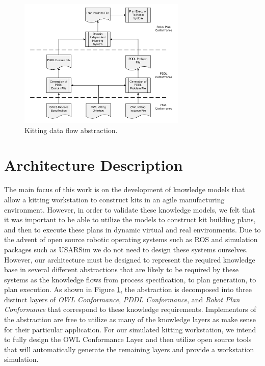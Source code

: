 \documentclass[a4paper, 10pt, conference]{ieeeconf}      %
\begin{document}
\begin{figure}[htb]
\includegraphics[width=8cm]{images/ProcessDataFlowV2.jpg}
\caption{Kitting data flow abstraction.}
\label{fig:ProcessDataFlow}
\end{figure}

\section{Architecture Description}
\label{sect:Architecture}
The main focus of this work is on the development of knowledge models that allow a kitting workstation to construct kits
in an agile manufacturing environment. However, in order to validate these knowledge models, we felt that it was
important to be able to utilize the models to construct kit building plans, and then to execute these plans in dynamic
virtual and real environments. Due to the advent of open source robotic operating systems such as ROS \cite{ROS} and simulation
packages such as USARSim \cite{Balakirsky2007} we do not need to design these systems ourselves. However, our architecture must
be designed to represent the required knowledge base in several different abstractions that are likely to be
required by these systems as the knowledge flows from process specification, to plan generation, to plan execution.
As shown in Figure \ref{fig:ProcessDataFlow}, the abstraction is decomposed into three
distinct layers of {\it OWL Conformance}, {\it PDDL Conformance}, and {\it Robot Plan Conformance} that correspond to these
knowledge requirements. Implementors of the abstraction are free to utilize as many of the knowledge layers as make sense for
their particular application. For our simulated kitting workstation, we intend to fully design the OWL Conformance Layer and
then utilize open
source tools that will automatically generate the remaining layers and provide a workstation simulation.
\end{document}
